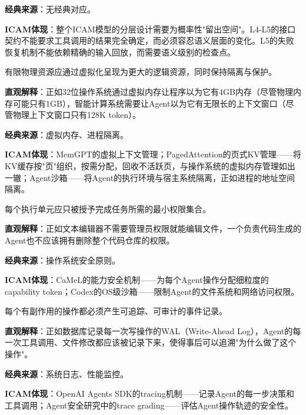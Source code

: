 \textbf{经典来源}：无经典对应。

\textbf{ICAM体现}：整个ICAM模型的分层设计需要为概率性"留出空间"。L4-L5的接口契约不能要求工具调用的结果完全确定，而必须容忍语义层面的变化。L5的失败恢复机制不能依赖精确的输入回放，而需要语义级别的检查点。

\begin{axiom}[虚拟化公理]
有限物理资源应通过虚拟化呈现为更大的逻辑资源，同时保持隔离与保护。
\end{axiom}

\textbf{直观解释}：正如32位操作系统通过虚拟内存让程序以为它有4GB内存（尽管物理内存可能只有1GB），智能计算系统需要让Agent以为它有无限长的上下文窗口（尽管物理上下文窗口只有128K token）。

\textbf{经典来源}：虚拟内存、进程隔离\cite{ostep_2023}。

\textbf{ICAM体现}：MemGPT的虚拟上下文管理\cite{memgpt2023}；PagedAttention的页式KV管理\cite{kwon2023pagedattention}——将KV缓存按"页"组织，按需分配，回收不活跃页，与操作系统的虚拟内存管理如出一辙；Agent沙箱\cite{openai_codex_sandbox_2026}——将Agent的执行环境与宿主系统隔离，正如进程的地址空间隔离。

\begin{axiom}[最小权限公理]
每个执行单元应只被授予完成任务所需的最小权限集合。
\end{axiom}

\textbf{直观解释}：正如文本编辑器不需要管理员权限就能编辑文件，一个负责代码生成的Agent也不应该拥有删除整个代码仓库的权限。

\textbf{经典来源}：操作系统安全原则\cite{ostep_2023}。

\textbf{ICAM体现}：CaMeL的能力安全机制\cite{debenedetti2025camel}——为每个Agent操作分配细粒度的capability token；Codex的OS级沙箱\cite{openai_codex_security_2026}——限制Agent的文件系统和网络访问权限。

\begin{axiom}[可观测性公理]
每个有副作用的操作都必须产生可追踪、可审计的事件记录。
\end{axiom}

\textbf{直观解释}：正如数据库记录每一次写操作的WAL（Write-Ahead Log），Agent的每一次工具调用、文件修改都应该被记录下来，使得事后可以追溯"为什么做了这个操作"。

\textbf{经典来源}：系统日志、性能监控\cite{linux_cgroup_2026}。

\textbf{ICAM体现}：OpenAI Agents SDK的tracing机制\cite{openai_codex_agentsdk_2026}——记录Agent的每一步决策和工具调用；Agent安全研究中的trace grading\cite{agenticsecurity2025}——评估Agent操作轨迹的安全性。


